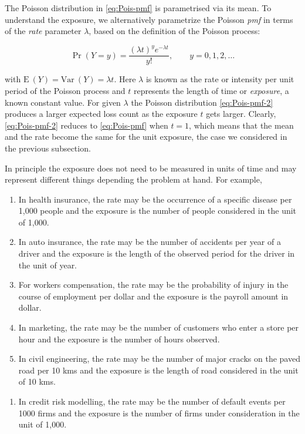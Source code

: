 \documentclass[]{book}
\providecommand{\tightlist}{%
  \setlength{\itemsep}{0pt}\setlength{\parskip}{0pt}}
\theoremstyle{definition}
\theoremstyle{definition}
\theoremstyle{definition}
\theoremstyle{remark}
\begin{document}
The Poisson distribution in \eqref{eq:Pois-pmf} is parametrised via its
mean. To understand the exposure, we alternatively parametrize the
Poisson \emph{pmf} in terms of the \emph{rate} parameter \(\lambda\),
based on the definition of the Poisson process:

\begin{equation}
\Pr(Y=y)=\frac{(\lambda t)^y e^{-\lambda t}}{y!},\qquad y=0,1,2, \ldots
\label{eq:Pois-pmf-2}
\end{equation}

with \(\mathrm{E~}{(Y)}=\mathrm{Var~}{(Y)}=\lambda t\). Here \(\lambda\)
is known as the rate or intensity per unit period of the Poisson process
and \(t\) represents the length of time or \emph{exposure}, a known
constant value. For given \(\lambda\) the Poisson distribution
\eqref{eq:Pois-pmf-2} produces a larger expected loss count as the
exposure \(t\) gets larger. Clearly, \eqref{eq:Pois-pmf-2} reduces to
\eqref{eq:Pois-pmf} when \(t=1\), which means that the mean and the rate
become the same for the unit exposure, the case we considered in the
previous subsection.

In principle the exposure does not need to be measured in units of time
and may represent different things depending the problem at hand. For
example,

\begin{enumerate}
\def\labelenumi{\arabic{enumi}.}
\item
  In health insurance, the rate may be the occurrence of a specific
  disease per 1,000 people and the exposure is the number of people
  considered in the unit of 1,000.
\item
  In auto insurance, the rate may be the number of accidents per year of
  a driver and the exposure is the length of the observed period for the
  driver in the unit of year.
\item
  For workers compensation, the rate may be the probability of injury in
  the course of employment per dollar and the exposure is the payroll
  amount in dollar.
\item
  In marketing, the rate may be the number of customers who enter a
  store per hour and the exposure is the number of hours observed.
\item
  In civil engineering, the rate may be the number of major cracks on
  the paved road per 10 kms and the exposure is the length of road
  considered in the unit of 10 kms.
\end{enumerate}

\begin{enumerate}
\def\labelenumi{\arabic{enumi}.}
\setcounter{enumi}{5}
\tightlist
\item
  In credit risk modelling, the rate may be the number of default events
  per 1000 firms and the exposure is the number of firms under
  consideration in the unit of 1,000.
\end{enumerate}
\end{document}
